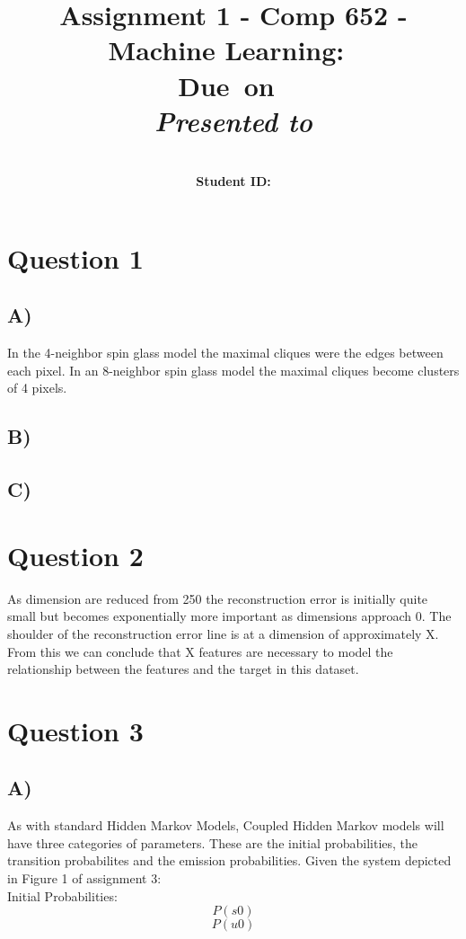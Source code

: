\documentclass{report}
\title{Assignment 1 - Comp 652 - Machine Learning}
\title{\vspace{2in}\textmd{\textbf{\hmwkClass:\ \hmwkTitle}}\\
\normalsize\vspace{0.1in}\small{Due\ on\ \hmwkDueDate}\\
\vspace{0.1in}\large{\textit{Presented to \hmwkClassInstructor}}\vspace{3in}}
\date{}
\author{\textbf{\hmwkAuthorName}\\
    \textbf{Student ID: \hmwkAuthorNumber}}
\begin{document}
\maketitle
\section*{Question 1}
\subsection*{A)}
In the 4-neighbor spin glass model the maximal cliques were the edges between
each pixel. In an 8-neighbor spin glass model the maximal cliques become
clusters of 4 pixels.
\subsection*{B)}

\subsection*{C)}

\section*{Question 2}
As dimension are reduced from 250 the reconstruction error is initially quite
small but becomes exponentially more important as dimensions approach 0. The
shoulder of the reconstruction error line is at a dimension of approximately X.
From this we can conclude that X features are necessary to model the relationship
between the features and the target in this dataset.
\section*{Question 3}
\subsection*{A)}
As with standard Hidden Markov Models, Coupled Hidden Markov models will
have three categories of parameters. These are the initial probabilities, the
transition probabilites and the emission probabilities. Given the system
depicted in Figure 1 of assignment 3:\\

Initial Probabilities:
\begin{equation}
  P(s0)
\end{equation}
\begin{equation}
  P(u0)
\end{equation}\\
\end{document}

